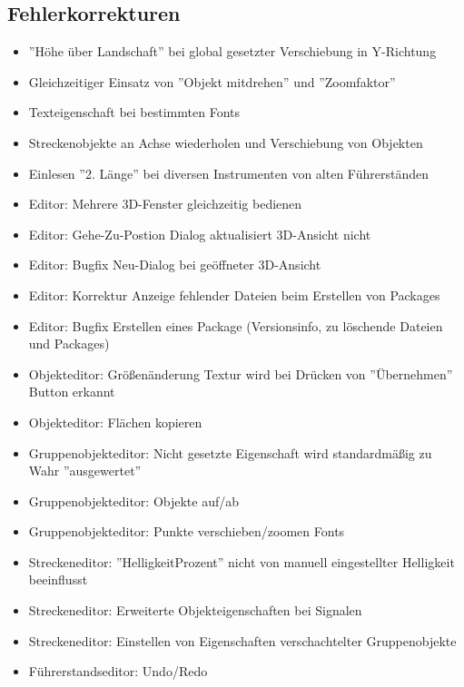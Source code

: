 \subsection{Fehlerkorrekturen}
\begin{itemize}
\item ''Höhe über Landschaft'' bei global gesetzter Verschiebung in Y-Richtung
\item Gleichzeitiger Einsatz von ''Objekt mitdrehen'' und ''Zoomfaktor''
\item Texteigenschaft bei bestimmten Fonts
\item Streckenobjekte an Achse wiederholen und Verschiebung von Objekten
\item Einlesen ''2. Länge'' bei diversen Instrumenten von alten Führerständen

\item Editor: Mehrere 3D-Fenster gleichzeitig bedienen
\item Editor: Gehe-Zu-Postion Dialog aktualisiert 3D-Ansicht nicht
\item Editor: Bugfix Neu-Dialog bei geöffneter 3D-Ansicht
\item Editor: Korrektur Anzeige fehlender Dateien beim Erstellen von Packages
\item Editor: Bugfix Erstellen eines Package (Versionsinfo, zu löschende Dateien und Packages)

\item Objekteditor: Größenänderung Textur wird bei Drücken von ''Übernehmen'' Button erkannt
\item Objekteditor: Flächen kopieren

\item Gruppenobjekteditor: Nicht gesetzte Eigenschaft wird standardmäßig zu Wahr ''ausgewertet''
\item Gruppenobjekteditor: Objekte auf/ab
\item Gruppenobjekteditor: Punkte verschieben/zoomen Fonts

\item Streckeneditor: ''HelligkeitProzent'' nicht von manuell eingestellter Helligkeit beeinflusst
\item Streckeneditor: Erweiterte Objekteigenschaften bei Signalen
\item Streckeneditor: Einstellen von Eigenschaften verschachtelter Gruppenobjekte

\item Führerstandseditor: Undo/Redo
\end{itemize}


